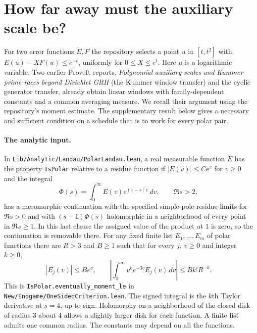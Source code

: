 \section{How far away must the auxiliary scale be?}
For two error functions $E,F$ the repository selects a point $u$ in $[t,t^2]$ with
$E(u)-X F(u)\le e^{-t}$, uniformly for $0\le X\le e^t$.
Here $u$ is a logarithmic variable. Two earlier ProveIt reports, \emph{Polynomial auxiliary scales and Kummer prime races beyond Dirichlet GRH} (the Kummer window transfer) and the cyclic generator transfer, already obtain linear windows with family-dependent constants and a common averaging measure. We recall their argument using the repository's moment estimate. The supplementary result below gives a necessary and sufficient condition on a schedule that is to work for every polar pair.

\paragraph{The analytic input.}
In \texttt{Lib/Analytic/Landau/PolarLandau.lean}, a real measurable function $E$ has the property \texttt{IsPolar} relative to a residue function if $|E(v)|\le C e^v$ for $v\ge0$ and the integral
\[
  \Phi(s)=\int_0^\infty E(v)e^{(1-s)v}\,dv,\qquad \Re s>2,
\]
has a meromorphic continuation with the specified simple-pole residue limits for $\Re s>0$ and with $(s-1)\Phi(s)$ holomorphic in a neighborhood of every point in $\Re s\ge1$. In this last clause the assigned value of the product at $1$ is zero, so the continuation is removable there.
For any fixed finite list $E_1,\dots,E_m$ of polar functions there are $R>3$ and $B\ge1$ such that for every $j$, $v\ge0$ and integer $k\ge0$,
\begin{equation}
 |E_j(v)|\le B e^v,\qquad
 \left|\int_0^\infty v^k e^{-3v} E_j(v)\,dv\right|
 \le B k! R^{-k}. \label{src:moment}
\end{equation}
This is \texttt{IsPolar.eventually\_moment\_le} in
\texttt{New/Endgame/OneSidedCriterion.lean}. The signed integral is the $k$th Taylor derivative at $s=4$, up to sign. Holomorphy on a neighborhood of the closed disk of radius $3$ about $4$ allows a slightly larger disk for each function. A finite list admits one common radius. The constants may depend on all the functions.

